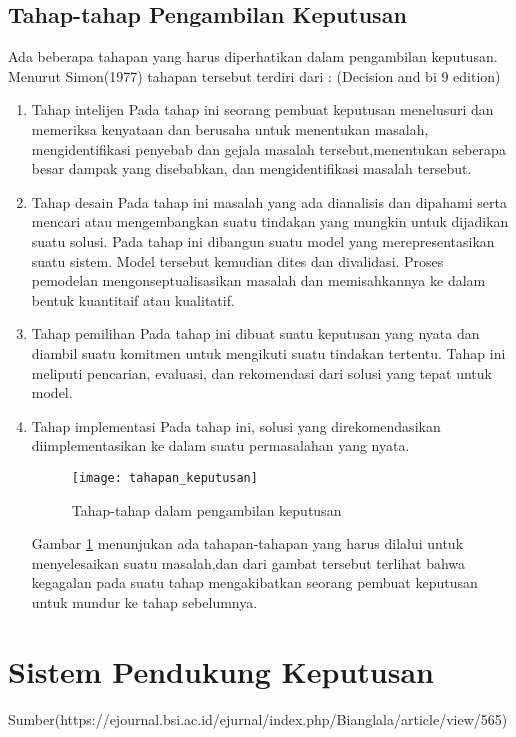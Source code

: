 \subsection{Tahap-tahap Pengambilan Keputusan}
Ada beberapa tahapan yang harus diperhatikan dalam pengambilan keputusan. Menurut Simon(1977) tahapan tersebut terdiri dari : (Decision and bi 9 edition)
\begin{enumerate}
	\item Tahap intelijen
Pada tahap ini seorang pembuat keputusan menelusuri dan memeriksa kenyataan dan berusaha untuk menentukan masalah, mengidentifikasi penyebab dan gejala masalah tersebut,menentukan seberapa besar dampak yang disebabkan, dan mengidentifikasi masalah tersebut.
	\item Tahap desain
Pada tahap ini masalah yang ada dianalisis dan dipahami serta mencari atau mengembangkan suatu tindakan yang mungkin untuk dijadikan suatu solusi. Pada tahap ini dibangun suatu model yang merepresentasikan suatu sistem. Model tersebut kemudian dites dan divalidasi. Proses pemodelan mengonseptualisasikan masalah dan memisahkannya ke dalam bentuk kuantitaif atau kualitatif.
	\item Tahap pemilihan
Pada tahap ini dibuat suatu keputusan yang nyata dan diambil suatu komitmen untuk mengikuti suatu tindakan tertentu. Tahap ini meliputi pencarian, evaluasi, dan rekomendasi dari solusi yang tepat untuk model.
	\item Tahap implementasi
Pada tahap ini, solusi yang direkomendasikan diimplementasikan ke dalam suatu permasalahan yang nyata.

\begin{figure}[H]
	\centering  
	\texttt{[image: tahapan\_keputusan]}  
	\caption[Tahap-tahap dalam pengambilan keputusan]{Tahap-tahap dalam pengambilan keputusan} 
	\label{fig:tahapan_keputusan} 
\end{figure} 

Gambar \ref{fig:tahapan_keputusan} menunjukan ada tahapan-tahapan yang harus dilalui untuk menyelesaikan suatu masalah,dan dari gambat tersebut terlihat bahwa kegagalan pada suatu tahap mengakibatkan seorang pembuat keputusan untuk mundur ke tahap sebelumnya.
	
\end{enumerate}

\section{Sistem Pendukung Keputusan}Sumber(https://ejournal.bsi.ac.id/ejurnal/index.php/Bianglala/article/view/565)
